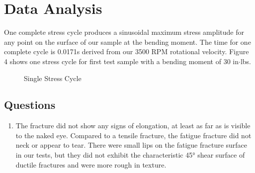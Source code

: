 \documentclass{article}
\begin{document}
\section{Data Analysis}
\begin{multicols}{2}
One complete stress cycle produces a sinusoidal maximum stress amplitude for any point on the surface of our sample at the bending moment. The time for one complete cycle is 0.0171\si{s} derived from our 3500 RPM rotational velocity. Figure 4 shows one stress cycle for first test sample with a bending moment of 30 in$\cdot$lbs.
\begin{figure}[H]
 \caption{Single Stress Cycle}
    \label{tab:graph1}
\end{figure}
\subsection*{Questions}
\begin{enumerate}
\item The fracture did not show any signs of elongation, at least as far as is visible to the naked eye. Compared to a tensile fracture, the fatigue fracture did not neck or appear to tear. There were small lips on the fatigue fracture surface in our tests, but they did not exhibit the characteristic \ang{45} shear surface of ductile fractures and were more rough in texture.


\end{enumerate}
\end{multicols}
\end{document}
